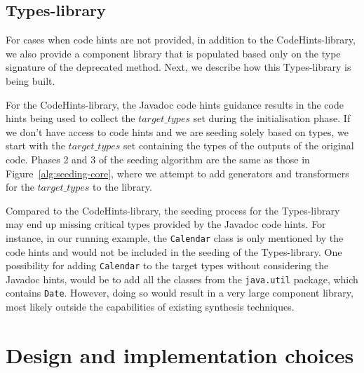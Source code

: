 \documentclass[sigconf]{acmart}
\newcommand{\targettypes}{\mbox{$\mathit{target\_types}$}\xspace}
\begin{document}
\subsection{Types-library} \label{sec:extend-library}

For cases when code hints are not provided, in addition to the
CodeHints-library, we also provide a component library that is populated
based only on the type signature of the deprecated method.  Next, we
describe how this Types-library is being built.

For the CodeHints-library, the Javadoc code hints guidance results in the code hints being
used to collect the \targettypes set during the initialisation phase.
If we don't have access to code hints and we are seeding solely
based on types, we start with the \targettypes set containing
the types %
of the outputs of the original code. %
Phases 2 and 3 of the seeding algorithm are the same as those in Figure~\ref{alg:seeding-core},
where we attempt to add generators and transformers for the \targettypes to the library.


%
Compared to the CodeHints-library, the seeding process for the Types-library
may end up missing critical types provided by the Javadoc code hints.  For
instance, in our running example, the \lstinline[breaklines=true]{Calendar}
class is only mentioned by the code hints and would not be included in the
seeding of the Types-library.  One possibility for adding
\lstinline[breaklines=true]{Calendar} to the target types without considering
the Javadoc hints, would be to add all the classes from the
\lstinline[breaklines=true]{java.util} package, which contains
\lstinline[breaklines=true]{Date}.  However, doing so would result in a very
large component library, most likely outside the capabilities of existing
synthesis techniques.

\section{Design and implementation choices} \label{sec:implementation}

\end{document}
